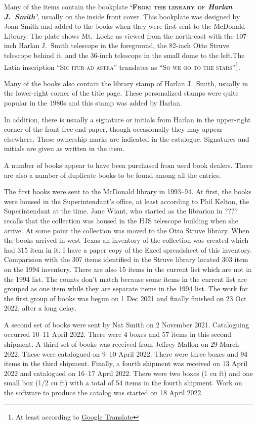Many of the items contain the bookplate {\bfseries\textsc{`From the
    library of} \textit{Harlan J.~Smith'}}, usually on the inside
front cover. This bookplate was designed by Joan Smith and added to
the books when they were first sent to the McDonald Library. The plate
shows Mt.~Locke as viewed from the north-east with the 107-inch Harlan
J.~Smith telescope in the foreground, the 82-inch Otto Struve
telescope behind it, and the 36-inch telescope in the small dome to
the left.The Latin inscription \textsc{``Sic itur ad astra''}
translates as \textsc{``So we go to the stars''}\footnote{At least
according to \href{https://translate.google.com}{Google Translate}}.

Many of the books also contain the library stamp of Harlan J.~Smith,
usually in the lower-right corner of the title page. These
personalized stamps were quite popular in the 1980s and this stamp was
added by Harlan.

In addition, there is usually a signature or initials from Harlan in
the upper-right corner of the front free end paper, though
occasionally they may appear elsewhere.  These ownership marks are
indicated in the catalogue.  Signatures and initials are given as
written in the item.

A number of books appear to have been purchased from used book dealers.
There are also a number of duplicate books to be found among all the
entries. 

The first books were sent to the McDonald library in 1993--94. At
first, the books were housed in the Superintendant's office, at least
according to Phil Kelton, the Superintendant at the time.  Jane Wiant,
who started as the librarion in ???? recalls that the collection was
housed in the HJS telescope building when she arrive.  At some point
the collection was moved to the Otto Struve library.  When the books
arrived in west Texas an inventory of the collection was created which
had 315 item in it. I have a paper copy of the Excel spreadsheet of
this inventory.  Comparision with the 307 items identified in the
Struve library located 303 item on the 1994 inventory. There are also 15
items in the current list which are not in the 1994 list.  The counts
don't match because some items in the current list are grouped as one
item while they are separate items in the 1994 list.  The work for
the first group of books was begun on 1 Dec 2021 and finally finished
on 23 Oct 2022, after a long delay.

A second set of books were sent by Nat Smith on 2 November 2021.
Cataloguing occurred 10--11 April 2022. There were 4 boxes and 57 items
in this second shipment. A third set of books was received from
Jeffrey Mallon on 29 March 2022. These were catalogued on 9--10 April
2022. There were three boxes and 94 items in the third
shipment. Finally, a fourth shipment was received on 13 April 2022 and
catalogued on 16--17 April 2022. There were two boxes (1 cu ft) and
one small box (1/2 cu ft) with a total of 54 items in the fourth
shipment.  Work on the software to produce the catalog was started on
18 April 2022.

